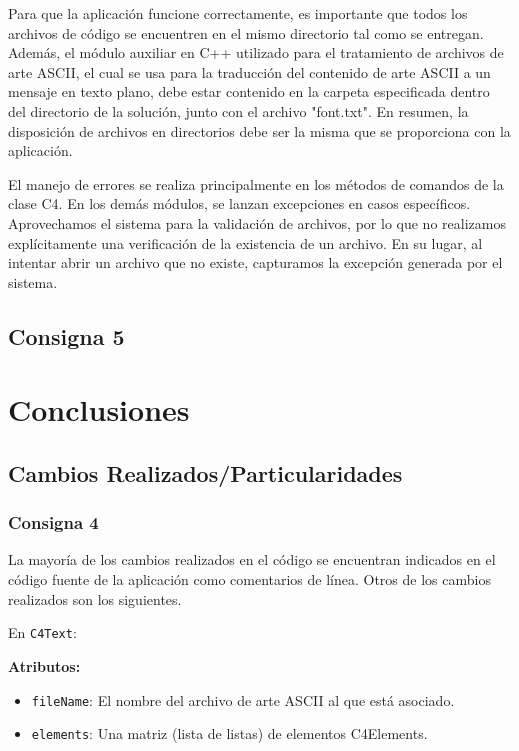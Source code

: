 \documentclass[a4paper,12pt]{article}
\begin{document}
Para que la aplicación funcione correctamente, es importante que todos los archivos de código se encuentren en el mismo directorio tal como se entregan. Además, el módulo auxiliar en C++ utilizado para el tratamiento de archivos de arte ASCII, el cual se usa para la traducción del contenido de arte ASCII a un mensaje en texto plano, debe estar contenido en la carpeta especificada dentro del directorio de la solución, junto con el archivo "font.txt". En resumen, la disposición de archivos en directorios debe ser la misma que se proporciona con la aplicación.

El manejo de errores se realiza principalmente en los métodos de comandos de la clase C4. En los demás módulos, se lanzan excepciones en casos específicos. Aprovechamos el sistema para la validación de archivos, por lo que no realizamos explícitamente una verificación de la existencia de un archivo. En su lugar, al intentar abrir un archivo que no existe, capturamos la excepción generada por el sistema.


\subsection{Consigna 5}

\section{Conclusiones}
\subsection{Cambios Realizados/Particularidades}
\subsubsection{Consigna 4}

La mayoría de los cambios realizados en el código se encuentran indicados en el código fuente de la aplicación como comentarios de línea. Otros de los cambios realizados son los siguientes.

En \texttt{C4Text}:

\textbf{Atributos:}
\begin{itemize}
  \item \texttt{fileName}: El nombre del archivo de arte ASCII al que está asociado.
  \item \texttt{elements}: Una matriz (lista de listas) de elementos C4Elements.
\end{itemize}
\end{document}
